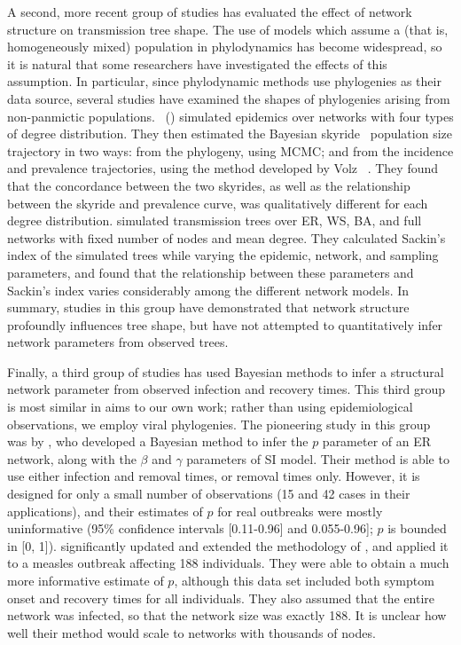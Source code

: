 A second, more recent group of studies has evaluated the effect of network
structure on transmission tree shape. The use of models which assume a
 (that is, homogeneously mixed) population in phylodynamics has
become widespread, so it is natural that some researchers have investigated the
effects of this assumption. In particular, since phylodynamic methods use
phylogenies as their data source, several studies have examined the shapes of
phylogenies arising from non-panmictic populations. 
\citeauthor{o2010contact}~(\citeyear{o2010contact}) simulated epidemics over
networks with four types of degree distribution. They then estimated the
Bayesian skyride~\autocite{minin2008smooth} population size trajectory in two
ways: from the phylogeny, using \gls{MCMC}; and from the incidence and
prevalence trajectories, using the method developed by Volz
\etal~\autocite{volz2009phylodynamics}. They found that the concordance between
the two skyrides, as well as the relationship between the skyride and
prevalence curve, was qualitatively different for each degree distribution.
\citeauthor{leventhal2012inferring} simulated transmission trees over \gls{ER},
\gls{WS}, \gls{BA}, and full networks with fixed number of nodes and mean
degree. They calculated Sackin's index of the simulated trees while varying the
epidemic, network, and sampling parameters, and found that the relationship
between these parameters and Sackin's index varies considerably among the
different network models. In summary, studies in this group have demonstrated
that network structure profoundly influences tree shape, but have not attempted
to quantitatively infer network parameters from observed trees.

Finally, a third group of studies has used Bayesian methods to infer a
structural network parameter from observed infection and recovery times. This
third group is most similar in aims to our own work; rather than using
epidemiological observations, we employ viral phylogenies. The pioneering study
in this group was by \textcite{britton2002bayesian}, who developed a Bayesian
method to infer the $p$ parameter of an \gls{ER} network, along with the
$\beta$ and $\gamma$ parameters of \gls{SI} model. Their method is able to use
either infection and removal times, or removal times only. However, it is
designed for only a small number of observations (15 and 42 cases in their
applications), and their estimates of $p$ for real outbreaks were mostly
uninformative (95\% confidence intervals [0.11-0.96] and 0.055-0.96]; $p$ is
bounded in [0, 1]).
\textcite{groendyke2011bayesian} significantly updated and extended the
methodology of \citeauthor{britton2002bayesian}, and applied it to a measles
outbreak affecting 188 individuals. They were able to obtain a much more
informative estimate of $p$, although this data set included both symptom onset
and recovery times for all individuals. They also assumed that the entire
network was infected, so that the network size was exactly 188. It is unclear
how well their method would scale to networks with thousands of nodes.

